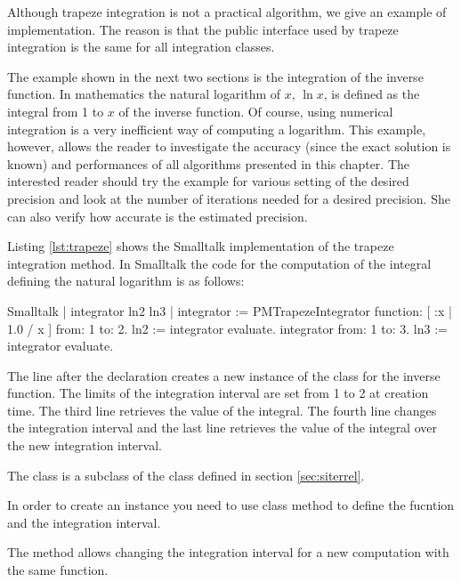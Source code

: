 Although trapeze integration is not a practical algorithm, we give
an example of implementation. The reason is that the public interface used by trapeze integration is the same for all integration classes.

The example shown in the next two sections is the integration of
the inverse function. In mathematics the natural logarithm of $x$,
$\ln x$, is defined as the integral from 1 to $x$ of the inverse
function. Of course, using numerical integration is a very
inefficient way of computing a logarithm. This example, however,
allows the reader to investigate the accuracy (since the exact
solution is known) and performances of all algorithms presented in
this chapter. The interested reader should try the example for
various setting of the desired precision and look at the number of
iterations needed for a desired precision. She can also verify how
accurate is the estimated precision.

Listing \ref{lst:trapeze} shows the Smalltalk implementation of the trapeze integration method. In Smalltalk the code for the computation of the integral defining the natural logarithm is as follows:
\begin{displaycode}{Smalltalk}
| integrator ln2 ln3 |
integrator := PMTrapezeIntegrator
                 function: [ :x | 1.0 / x ] from: 1 to: 2.
ln2 := integrator evaluate.
integrator from: 1 to: 3.
ln3 := integrator evaluate.
\end{displaycode}
The line after the declaration creates a new instance of the class  for the inverse function. The limits of the integration interval are set from 1 to 2 at creation time. The
third line retrieves the value of the integral. The fourth line
changes the integration interval and the last line retrieves the
value of the integral over the new integration interval.

The class  is a subclass of the class
 defined in section
\ref{sec:siterrel}.

In order to create an instance you need to use class method  to define the fucntion and the integration interval.


The method  allows changing the integration interval
for a new computation with the same function.

